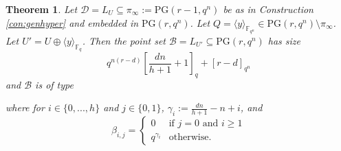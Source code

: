 \documentclass[11pt]{amsart}
\newtheorem{theorem}{Theorem}[section]
\newcommand{\F}{{\mathbb F}}
\newcommand{\PG}{\mathrm{PG}}
\begin{document}
\begin{theorem}\label{th:intersectsizes}
Let $\mathcal{D}=L_{U} \subseteq \pi_{\infty}:=\PG(r-1,q^n)$ be as in Construction \ref{con:genhyper} and embedded in $\PG(r,q^n)$. Let $Q=\langle y \rangle_{\F_{q^n}} \in \PG(r,q^n) \setminus \pi_{\infty}$. Let $U'=U \oplus \langle y \rangle_{\F_{q}}$.
Then the point set $\mathcal{B}=L_{U'} \subseteq \PG(r,q^n)$ has size
\[
q^{n(r-d)}\left[\frac{dn}{h+1}+1\right]_q+[r-d]_{q^n}
\]
and $\mathcal{B}$ is of type
\begin{center}
\end{center}

where for $i\in\{0,...,h\}$ and $j \in \{0,1\}$, $\gamma_i:=\frac{dn}{h+1}-n+i$, and 
\[\beta_{i,j} = \begin{cases}
0 & \text{if } j=0 \text{ and } i \geq 1\\
q^{\gamma_i} & \text{otherwise}.
\end{cases}
\]
\end{theorem}
\end{document}
